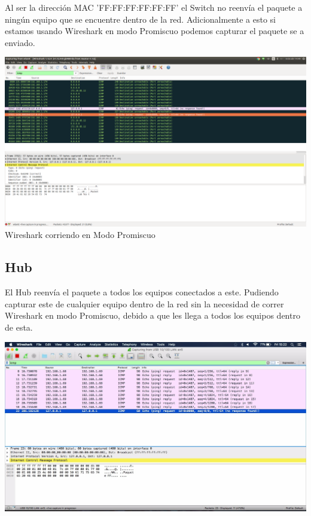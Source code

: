 \documentclass[spanish]{udpreport}
\begin{document}
Al ser la dirección MAC 'FF:FF:FF:FF:FF:FF' el Switch no reenvía el paquete a ningún equipo que se encuentre dentro de la red. Adicionalmente a esto si estamos usando Wireshark en modo Promiscuo podemos capturar el paquete se a enviado.

\begin{center}
	\includegraphics[scale=.21]{imagenes/Switch/FF.png}
	\\ Wireshark corriendo en Modo Promiscuo
\end{center}



\subsection{Hub}

El Hub reenvía el paquete a todos los equipos conectados a este. Pudiendo capturar este de cualquier equipo dentro de la red sin la necesidad de correr Wireshark en modo Promiscuo, debido a que les llega a todos los equipos dentro de esta.

\begin{center}
	\includegraphics[scale=.3]{imagenes/Hub/FF.jpg}
\end{center}
\end{document}
